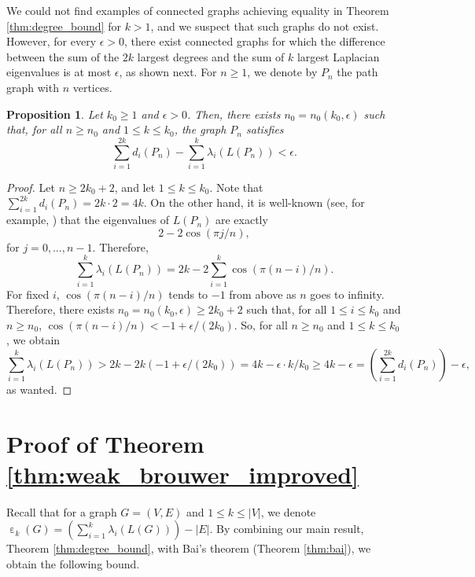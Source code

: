 \documentclass[a4paper,11pt]{article}
\theoremstyle{plain}
\newtheorem{proposition}[theorem]{\bf Proposition}
\theoremstyle{definition}
\numberwithin{theorem}{section}
\numberwithin{equation}{section}
\DeclareMathOperator{\eps}{\varepsilon}
\begin{document}
We could not find examples of connected graphs achieving equality in Theorem \ref{thm:degree_bound} for $k>1$, and we suspect that such graphs do not exist. However, for every $\epsilon>0$, there exist connected graphs for which the difference between the sum of the $2k$ largest degrees and the sum of $k$ largest Laplacian eigenvalues is at most $\epsilon$, as shown next. 
For $n\ge 1$, we denote by $P_n$ the path graph with $n$ vertices.

\begin{proposition}
    Let $k_0\ge 1$ and $\epsilon>0$. Then, there exists $n_0=n_0(k_0,\epsilon)$ such that, for all $n\ge n_0$ and $1\le k\le k_0$, the graph $P_n$ satisfies
    \[
       \sum_{i=1}^{2k}d_i(P_n)- \sum_{i=1}^k \lambda_i(L(P_n))<\epsilon.
    \]
\end{proposition}
\begin{proof}
   Let $n\ge 2k_0+2$, and let $1\le k\le k_0$. Note that $\sum_{i=1}^{2k} d_i(P_n)=2k\cdot 2= 4k$. 
   On the other hand, it is well-known (see, for example, \cite[p. 9]{brouwer2012book}) that the eigenvalues of $L(P_n)$ are exactly
   \[
     2-2\cos(\pi j/n),
   \]
   for $j=0,\ldots,n-1$. Therefore,
   \[
    \sum_{i=1}^k \lambda_i(L(P_n)) = 2k-2\sum_{i=1}^k \cos(\pi (n-i)/n).
   \]
   For fixed $i$, $\cos(\pi (n-i)/n)$ tends to $-1$ from above as $n$ goes to infinity. Therefore, there exists $n_0=n_0(k_0,\epsilon)\ge 2k_0+2$ such that, for all $1\le i\le k_0$ and $n\ge n_0$, $\cos(\pi (n-i)/n)<-1+\epsilon/(2k_0)$. So, for all $n\ge n_0$ and $1\le k\le k_0$, we obtain
   \[
    \sum_{i=1}^k \lambda_i(L(P_n))> 2k - 2k(-1+\epsilon/(2k_0))= 4k-\epsilon\cdot k/k_0\ge 4k-\epsilon =\left(\sum_{i=1}^{2k}d_i(P_n)\right)-\epsilon,
   \]
   as wanted.
\end{proof}


\section{Proof of Theorem \ref{thm:weak_brouwer_improved}}\label{sec:brouwer}

Recall that for a graph $G=(V,E)$ and $1\le k\le |V|$, we denote $\eps_k(G)=\left(\sum_{i=1}^k \lambda_i(L(G))\right)-|E|$. 
By combining our main result, Theorem \ref{thm:degree_bound}, with Bai's theorem (Theorem \ref{thm:bai}), we obtain the following bound. 
\end{document}
